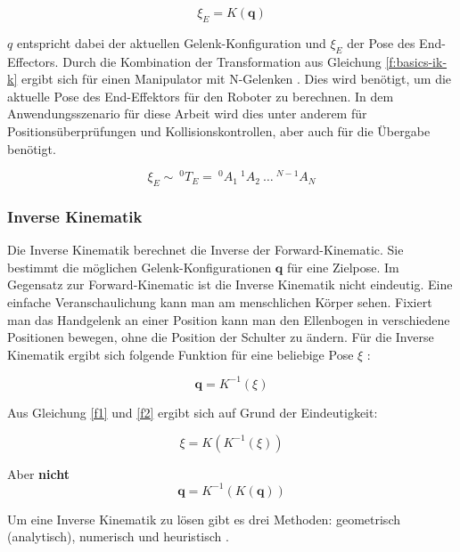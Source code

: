 \begin{equation}
\xi_E = K(\textbf{q})
\label{f1}
\end{equation}

$q$ entspricht dabei der aktuellen Gelenk-Konfiguration und $\xi_E$ der Pose des End-Effectors. Durch die Kombination der Transformation aus Gleichung \ref{f:basics-ik-k} ergibt sich für einen Manipulator mit N-Gelenken  \cite{Corke2011}. Dies wird benötigt, um die aktuelle Pose des End-Effektors für den Roboter zu berechnen. In dem Anwendungsszenario für diese Arbeit wird dies unter anderem für Positionsüberprüfungen und Kollisionskontrollen, aber auch für die Übergabe benötigt.

\begin{equation}
\xi_E \sim \: ^0T_E =\: ^0A_1\:^1A_2 \:\dots\:^{N-1}A_N
\end{equation}

\subsubsection{Inverse Kinematik}

Die Inverse Kinematik berechnet die Inverse der Forward-Kinematic. Sie bestimmt die möglichen Gelenk-Konfigurationen $\textbf{q}$ für eine Zielpose. Im Gegensatz zur Forward-Kinematic ist die Inverse Kinematik nicht eindeutig. Eine einfache Veranschaulichung kann man am menschlichen Körper sehen. Fixiert man das Handgelenk an einer Position kann man den Ellenbogen in verschiedene Positionen bewegen, ohne die Position der Schulter zu ändern. Für die Inverse Kinematik ergibt sich folgende Funktion für eine beliebige Pose $\xi$ \citep{Corke2011}:


\begin{equation}
\textbf{q} = K^{-1}(\xi)
\label{f2}
\end{equation}

Aus Gleichung \ref{f1} und \ref{f2} ergibt sich auf Grund der Eindeutigkeit:

\begin{displaymath}
\xi = K(K^{-1}(\xi))
\end{displaymath}

Aber \textbf{nicht}
\begin{displaymath}
\textbf{q} = K^{-1}(K(\textbf{q}))
\end{displaymath}

Um eine Inverse Kinematik zu lösen gibt es drei Methoden: geometrisch (analytisch), numerisch und heuristisch \citep{danielasteidl2011}.

